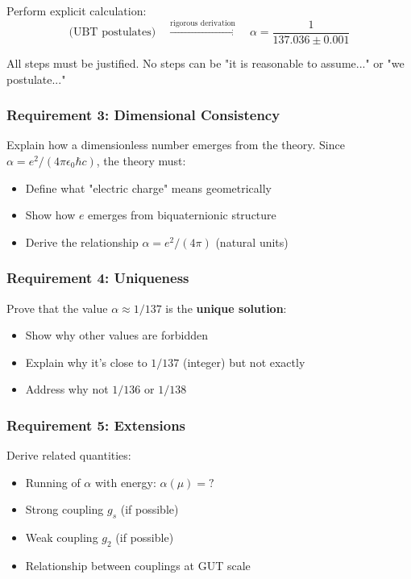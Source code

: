 Perform explicit calculation:
\begin{equation}
\text{(UBT postulates)} \quad \xrightarrow{\text{rigorous derivation}} \quad \alpha = \frac{1}{137.036 \pm 0.001}
\end{equation}

All steps must be justified. No steps can be "it is reasonable to assume..." or "we postulate..."

\subsubsection{Requirement 3: Dimensional Consistency}

Explain how a dimensionless number emerges from the theory. Since $\alpha = e^2/(4\pi\epsilon_0\hbar c)$, the theory must:
\begin{itemize}
\item Define what "electric charge" means geometrically
\item Show how $e$ emerges from biquaternionic structure
\item Derive the relationship $\alpha = e^2/(4\pi)$ (natural units)
\end{itemize}

\subsubsection{Requirement 4: Uniqueness}

Prove that the value $\alpha \approx 1/137$ is the \textbf{unique solution}:
\begin{itemize}
\item Show why other values are forbidden
\item Explain why it's close to $1/137$ (integer) but not exactly
\item Address why not $1/136$ or $1/138$
\end{itemize}

\subsubsection{Requirement 5: Extensions}

Derive related quantities:
\begin{itemize}
\item Running of $\alpha$ with energy: $\alpha(\mu) = ?$
\item Strong coupling $g_s$ (if possible)
\item Weak coupling $g_2$ (if possible)
\item Relationship between couplings at GUT scale
\end{itemize}

